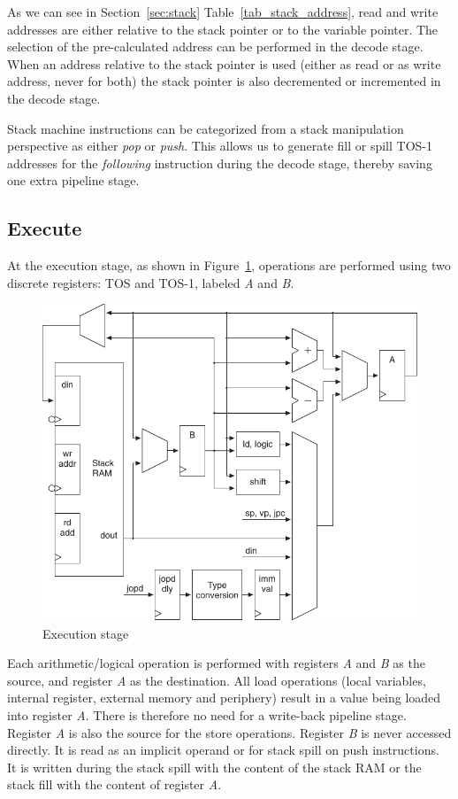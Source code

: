 As we can see in Section~\ref{sec:stack}
Table~\ref{tab_stack_address}, read and write addresses are either
relative to the stack pointer or to the variable pointer. The
selection of the pre-calculated address can be performed in the
decode stage. When an address relative to the stack pointer is used
(either as read or as write address, never for both) the stack
pointer is also decremented or incremented in the decode stage.

Stack machine instructions can be categorized from a stack
manipulation perspective as either \emph{pop} or \emph{push}. This
allows us to generate fill or spill TOS-1 addresses for the
\emph{following} instruction during the decode stage, thereby saving
one extra pipeline stage.

\subsection{Execute}

At the execution stage, as shown in Figure~\ref{fig_arch_exe},
operations are performed using two discrete registers: TOS and
TOS-1, labeled \emph{A} and \emph{B}.

\begin{figure}
    \centering
    \includegraphics[scale=\picscale]{arch/arch_execute}
    \caption{Execution stage}
    \label{fig_arch_exe}
\end{figure}

Each arithmetic/logical operation is performed with registers
\emph{A} and \emph{B} as the source, and register \emph{A} as the
destination. All load operations (local variables, internal
register, external memory and periphery) result in a value being
loaded into register \emph{A}. There is therefore no need for a
write-back pipeline stage. Register \emph{A} is also the source for
the store operations. Register \emph{B} is never accessed directly.
It is read as an implicit operand or for stack spill on push
instructions. It is written during the stack spill with the content
of the stack RAM or the stack fill with the content of register
\emph{A}.

